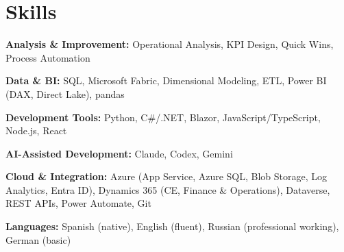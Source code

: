 \section{Skills}

\newcommand{\skillcat}[2]{\noindent\textbf{#1:} #2\par\vspace{2pt}}

\skillcat{Analysis \& Improvement}{Operational Analysis, KPI Design, Quick Wins, Process Automation}
\skillcat{Data \& BI}{SQL, Microsoft Fabric, Dimensional Modeling, ETL,
  Power BI (DAX, Direct Lake), pandas}
\skillcat{Development Tools}{Python, C\#/.NET, Blazor, JavaScript/TypeScript, Node.js, React}
\skillcat{AI-Assisted Development}{Claude, Codex, Gemini}
\skillcat{Cloud \& Integration}{Azure (App Service, Azure SQL, Blob Storage, Log Analytics, Entra ID),
  Dynamics 365 (CE, Finance \& Operations), Dataverse, REST APIs, Power Automate, Git}
\skillcat{Languages}{Spanish (native), English (fluent), Russian (professional working),
  German (basic)}
